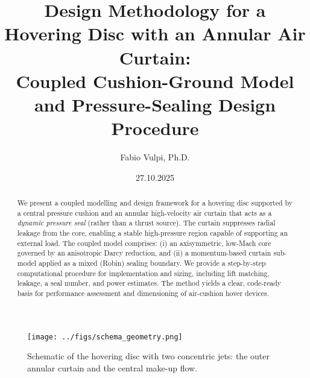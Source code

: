 \documentclass[11pt,a4paper]{article}
\title{Design Methodology for a Hovering Disc with an Annular Air Curtain:\\
Coupled Cushion-Ground Model and Pressure-Sealing Design Procedure}
\author{Fabio Vulpi, Ph.D.}
\date{27.10.2025}
\begin{document}
\maketitle

\begin{abstract}
We present a coupled modelling and design framework for a hovering disc supported by a central pressure cushion and an annular high-velocity air curtain that acts as a \emph{dynamic pressure seal} (rather than a thrust source). The curtain suppresses radial leakage from the core, enabling a stable high-pressure region capable of supporting an external load.
The coupled model comprises: (i) an axisymmetric, low-Mach core governed by an anisotropic Darcy reduction, and (ii) a momentum-based curtain sub-model applied as a mixed (Robin) sealing boundary. We provide a step-by-step computational procedure for implementation and sizing, including lift matching, leakage, a seal number, and power estimates. The method yields a clear, code-ready basis for performance assessment and dimensioning of air-cushion hover devices.
\end{abstract}

\begin{figure}[t]
  \centering
  \texttt{[image: ../figs/schema\_geometry.png]}
  \caption{Schematic of the hovering disc with two concentric jets: the outer annular curtain and the central make-up flow.}
  \label{fig:geometry}
\end{figure}
\end{document}
